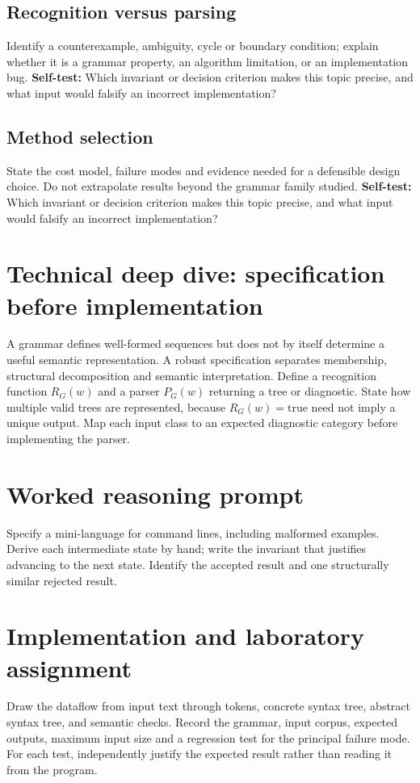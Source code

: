 \documentclass[11pt,letterpaper]{article}
\begin{document}
\subsection{Recognition versus parsing}
Identify a counterexample, ambiguity, cycle or boundary condition; explain whether it is a grammar property, an algorithm limitation, or an implementation bug.
\textbf{Self-test:} Which invariant or decision criterion makes this topic precise, and what input would falsify an incorrect implementation?
\subsection{Method selection}
State the cost model, failure modes and evidence needed for a defensible design choice. Do not extrapolate results beyond the grammar family studied.
\textbf{Self-test:} Which invariant or decision criterion makes this topic precise, and what input would falsify an incorrect implementation?
\section{Technical deep dive: specification before implementation}
A grammar defines well-formed sequences but does not by itself determine a useful semantic representation. A robust specification separates membership, structural decomposition and semantic interpretation. Define a recognition function $R_G(w)$ and a parser $P_G(w)$ returning a tree or diagnostic. State how multiple valid trees are represented, because $R_G(w)=\mathrm{true}$ need not imply a unique output. Map each input class to an expected diagnostic category before implementing the parser.
\section{Worked reasoning prompt}
Specify a mini-language for command lines, including malformed examples. Derive each intermediate state by hand; write the invariant that justifies advancing to the next state. Identify the accepted result and one structurally similar rejected result.
\section{Implementation and laboratory assignment}
Draw the dataflow from input text through tokens, concrete syntax tree, abstract syntax tree, and semantic checks. Record the grammar, input corpus, expected outputs, maximum input size and a regression test for the principal failure mode. For each test, independently justify the expected result rather than reading it from the program.
\end{document}
